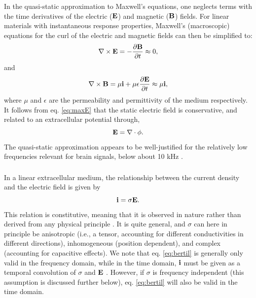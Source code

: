 \subsubsection{}
\label{sec:quasistatic}
In the quasi-static approximation to Maxwell's equations, one neglects terms with the time derivatives of the electric (${\bf E}$) and magnetic (${\bf B}$) fields. For linear materials with instantaneous response properties, Maxwell's (macroscopic) equations for the curl of the electric and magnetic fields can then be simplified to:
\begin{equation}
\nabla \times {\bf E} = - \frac{\partial {\bf B}}{\partial t}  \approx 0, 
\label{eq:maxE}
\end{equation}
and
\begin{equation}
\nabla \times {\bf B} = \mu{\bf i} + \mu \epsilon \frac{\partial {\bf E}}{\partial t} \approx  \mu {\bf i} ,
\label{eq:maxB}
\end{equation}
where $\mu$ and $\epsilon$ are the permeability and permittivity of the medium respectively. It follows from eq. \ref{eq:maxE} that the static electric field is conservative, and related to an extracellular potential through,
\begin{equation}
{\bf E} = \nabla \cdot \phi.
\label{eq:conservative}
\end{equation}
The quasi-static approximation appears to be well-justified for the relatively low frequencies relevant for brain signals, below about 10 kHz \cite{Nunez2006, Grodzinsky2011}.


\subsubsection{ }
\label{sec:LinEx}
In a linear extracellular medium, the relationship between the current density and the electric field is given by
\begin{equation}
{\bf i} = \sigma {\bf E}.
\label{eq:bertil}
\end{equation}
This relation is constitutive, meaning that it is observed in nature rather than derived from any physical principle \citep{Nunez2006, Pettersen2012}. It is quite general, and $\sigma$ can here in principle be anisotropic (i.e., a tensor, accounting for different conductivities in different directions), inhomogeneous (position dependent), and complex (accounting for capacitive effects). We note that eq. \ref{eq:bertil} is generally only valid in the frequency domain, while in the time domain, ${\bf i}$ must be given as a temporal convolution of $\sigma$ and ${\bf E}$ \cite{Bedard2009}. However, if $\sigma$ is frequency independent (this assumption is discussed further below), eq. \ref{eq:bertil} will also be valid in the time domain.


